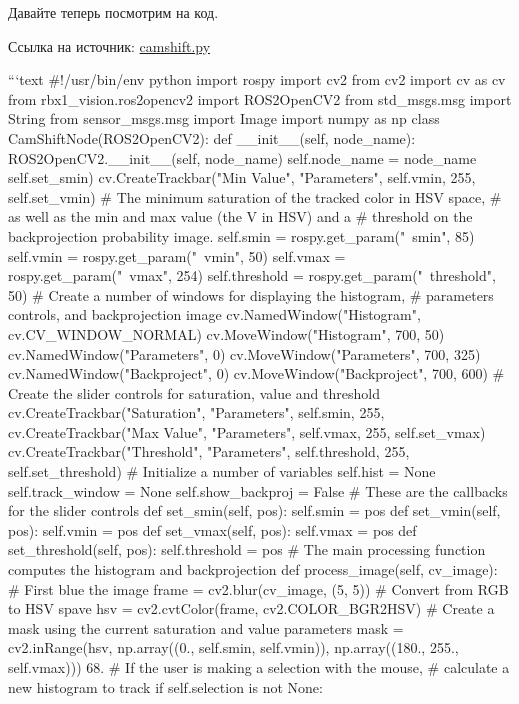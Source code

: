 {%

Давайте теперь посмотрим на код. 

Ссылка на источник: \href{https://github.com/pirobot/rbx1/blob/indigo-devel/rbx1_vision/nodes/camshift.py}{camshift.py}

```text
#!/usr/bin/env python 
import rospy
import cv2
from cv2 import cv as cv
from rbx1_vision.ros2opencv2 import ROS2OpenCV2
from std_msgs.msg import String
from sensor_msgs.msg import Image
import numpy as np
class CamShiftNode(ROS2OpenCV2):
def 
__init__(self, node_name): ROS2OpenCV2.__init__(self, node_name)
self.node_name = node_name
self.set_smin)
 cv.CreateTrackbar("Min Value", "Parameters", self.vmin, 255, self.set_vmin)
# The minimum saturation of the tracked color in HSV space, # as well as the min and max value (the V in HSV) and a
# threshold on the backprojection probability image. self.smin = rospy.get_param("~smin", 85)
self.vmin = rospy.get_param("~vmin", 50) self.vmax = rospy.get_param("~vmax", 254) self.threshold = rospy.get_param("~threshold", 50)
# Create a number of windows for displaying the histogram, # parameters controls, and backprojection image cv.NamedWindow("Histogram", cv.CV_WINDOW_NORMAL) cv.MoveWindow("Histogram", 700, 50) cv.NamedWindow("Parameters", 0) cv.MoveWindow("Parameters", 700, 325) cv.NamedWindow("Backproject", 0) cv.MoveWindow("Backproject", 700, 600)
# Create the slider controls for saturation, value and threshold
cv.CreateTrackbar("Saturation", "Parameters", self.smin, 255,
cv.CreateTrackbar("Max Value", "Parameters", self.vmax, 255, self.set_vmax)
cv.CreateTrackbar("Threshold", "Parameters", self.threshold, 255, self.set_threshold)
# Initialize a number of variables
self.hist = None self.track_window = None self.show_backproj = False
# These are the callbacks for the slider controls
def set_smin(self, pos): self.smin = pos
def set_vmin(self, pos): self.vmin = pos
def set_vmax(self, pos): self.vmax = pos
def set_threshold(self, pos): self.threshold = pos
# The main processing function computes the histogram and backprojection
def process_image(self, cv_image):
# First blue the image
frame = cv2.blur(cv_image, (5, 5))
# Convert from RGB to HSV spave
hsv = cv2.cvtColor(frame, cv2.COLOR_BGR2HSV)
# Create a mask using the current saturation and value parameters
mask = cv2.inRange(hsv, np.array((0., self.smin, self.vmin)),
np.array((180., 255., self.vmax))) 68.
# If the user is making a selection with the mouse,
# calculate a new histogram to track
if self.selection is not None:
}
